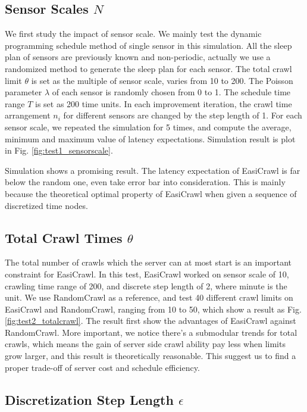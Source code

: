 \documentclass[conference]{IEEEtran}
\begin{document}
\subsection{Sensor Scales $N$}
We first study the impact of sensor scale. We mainly test the dynamic programming schedule method of single sensor in this simulation. All the sleep plan of sensors are previously known and non-periodic, actually we use a randomized method to generate the sleep plan for each sensor. The total crawl limit $\theta$ is set as the multiple of sensor scale, varies from 10 to 200. The Poisson parameter $\lambda$ of each sensor is randomly chosen from 0 to 1. The schedule time range $T$ is set as 200 time units. In each improvement iteration, the crawl time arrangement $n_i$ for different sensors are changed by the step length of 1. For each sensor scale, we repeated the simulation for 5 times, and compute the average, minimum and maximum value of latency expectations. Simulation result is plot in Fig. \ref{fig:test1_sensorscale}.


Simulation shows a promising result. The latency expectation of EasiCrawl is far below the random one, even take error bar into consideration. This is mainly because the theoretical optimal property of EasiCrawl when given a sequence of discretized time nodes. 

\subsection{Total Crawl Times $\theta$}

The total number of crawls which the server can at most start is an important constraint for EasiCrawl. In this test, EasiCrawl worked on sensor scale of 10, crawling time range of 200, and discrete step length of 2, where minute is the unit. We use RandomCrawl as a reference, and test 40 different crawl limits on EasiCrawl and RandomCrawl, ranging from 10 to 50, which show a result as Fig.\ref{fig:test2_totalcrawl}.
The result first show the advantages of EasiCrawl against RandomCrawl. More important, we notice there's a submodular trends for total crawls, which means the gain of server side crawl ability pay less when limits grow larger, and this result is theoretically reasonable. This suggest us to find a proper trade-off of server cost and schedule efficiency.

\subsection{Discretization Step Length $\epsilon$}
\end{document}
